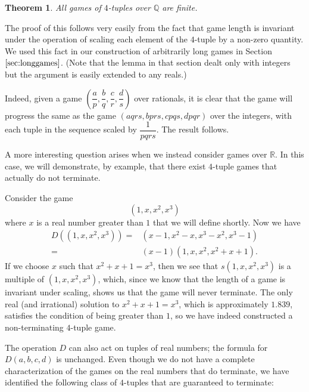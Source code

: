 \documentclass[12pt]{amsart}
\newtheorem{theorem}{Theorem}[section]
\newcommand{\diff}{D}
\begin{document}
\begin{theorem}
All games of $4$-tuples over $\mathbb{Q}$ are finite.
\end{theorem}

The proof of this follows very easily from the fact that game length is invariant under the operation of scaling each element of the $4$-tuple by a non-zero quantity. We used this fact in our construction of arbitrarily long games in Section $\ref{sec:longgames}$. (Note that the lemma in that section dealt only with integers but the argument is easily extended to any reals.)

Indeed, given a game $\left(\dfrac{a}{p}, \dfrac{b}{q}, \dfrac{c}{r}, \dfrac{d}{s}\right)$ over rationals, it is clear that the game will progress the same as the game $(aqrs, bprs, cpqs, dpqr)$ over the integers, with each tuple in the sequence scaled by $\dfrac{1}{pqrs}$. The result follows.

A more interesting question arises when we instead consider games over $\mathbb{R}$. In this case, we will demonstrate, by example, that there exist $4$-tuple games that actually do not terminate.

Consider the game
$$
(1,x,x^2,x^3)
$$
where $x$ is a real number greater than $1$ that we will define shortly. Now we have
\begin{align*}
\diff((1,x,x^2,x^3))
= & (x-1, x^2 - x, x^3 - x^2, x^3 - 1) \\
= & (x-1) (1, x, x^2, x^2 + x + 1).
\end{align*}
If we choose $x$ such that $x^2 + x + 1 = x^3$, then we see that $s(1,x,x^2,x^3)$ is a multiple of $(1,x,x^2,x^3)$, which, since we know that the length of a game is invariant under scaling, shows us that the game will never terminate. The only real (and irrational) solution to $x^2 + x + 1 = x^3$, which is approximately $1.839$, satisfies the condition of being greater than $1$, so we have indeed constructed a non-terminating $4$-tuple game.

The operation $\diff$ can also act on tuples of real numbers; the formula for $\diff(a, b, c, d)$ is unchanged. Even though we do not have a complete characterization of the games on the real numbers that do terminate, we have identified the following class of $4$-tuples that are guaranteed to terminate:
\end{document}
